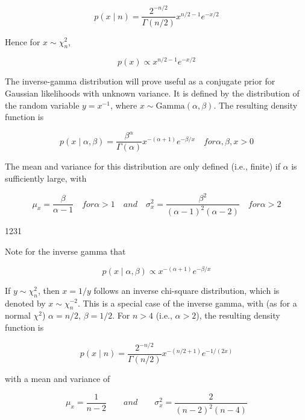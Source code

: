 \documentclass{article}
\begin{document}
\begin{equation}
p(x\mid n)=\frac{2^{-n/2}}{\Gamma(n/2)}x^{n/2-1}e^{-x/2}
\end{equation}

Hence for  $ x \sim \chi_{n}^{2} $,

\begin{equation}
p(x)\propto x^{n/2-1}e^{-x/2}
\end{equation}

The inverse-gamma distribution will prove useful as a conjugate prior for Gaussian likelihoods with unknown variance. It is defined by the distribution of the random variable  $ y = x^{-1} $, where  $ x \sim \text{Gamma}(\alpha, \beta) $. The resulting density function is

\begin{equation}
p(x\mid\alpha,\beta)=\frac{\beta^{\alpha}}{\Gamma(\alpha)}x^{-(\alpha+1)}e^{-\beta/x}\quad for\alpha,\beta,x>0
\end{equation}

The mean and variance for this distribution are only defined (i.e., finite) if  $ \alpha $ is sufficiently large, with

\begin{equation}
\mu_{x}=\frac{\beta}{\alpha-1}\quad for\alpha>1\quad and\quad\sigma_{x}^{2}=\frac{\beta^{2}}{(\alpha-1)^{2}(\alpha-2)}\quad for\alpha>2
\end{equation}

1231

Note for the inverse gamma that

\begin{equation}
p(x\mid\alpha,\beta)\propto x^{-(\alpha+1)}e^{-\beta/x}
\end{equation}

If  $ y \sim \chi_n^2 $, then  $ x = 1/y $ follows an inverse chi-square distribution, which is denoted by  $ x \sim \chi_n^{-2} $. This is a special case of the inverse gamma, with (as for a normal  $ \chi^2 $)  $ \alpha = n/2 $,  $ \beta = 1/2 $. For  $ n > 4 $ (i.e.,  $ \alpha > 2 $), the resulting density function is

\begin{equation}
p(x\mid n)=\frac{2^{-n/2}}{\Gamma(n/2)}x^{-(n/2+1)}e^{-1/(2x)}
\end{equation}

with a mean and variance of

\begin{equation}
\mu_{x}=\frac{1}{n-2}\qquad and\qquad\sigma_{x}^{2}=\frac{2}{(n-2)^{2}(n-4)}
\end{equation}
\end{document}
